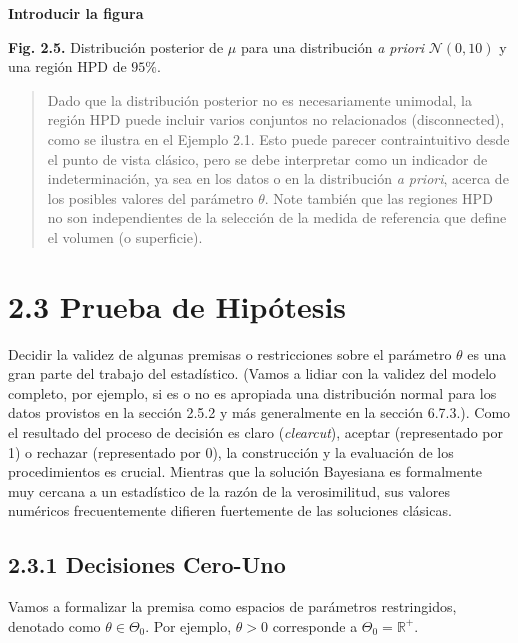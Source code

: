 \documentclass[12pt,]{article}
\begin{document}
\textbf{Introducir la figura}

\textbf{Fig. 2.5.} Distribución posterior de \(\mu\) para una
distribución \emph{a priori} \(\mathcal{N}(0,10)\) y una región HPD de
\(95\%\).

\begin{quote}
Dado que la distribución posterior no es necesariamente unimodal, la
región HPD puede incluir varios conjuntos no relacionados
(disconnected), como se ilustra en el Ejemplo 2.1. Esto puede parecer
contraintuitivo desde el punto de vista clásico, pero se debe
interpretar como un indicador de indeterminación, ya sea en los datos o
en la distribución \emph{a priori}, acerca de los posibles valores del
parámetro \(\theta\). Note también que las regiones HPD no son
independientes de la selección de la medida de referencia que define el
volumen (o superficie).
\end{quote}

\section{2.3 Prueba de Hipótesis}\label{prueba-de-hipotesis}

Decidir la validez de algunas premisas o restricciones sobre el
parámetro \(\theta\) es una gran parte del trabajo del estadístico.
(Vamos a lidiar con la validez del modelo completo, por ejemplo, si es o
no es apropiada una distribución normal para los datos provistos en la
sección 2.5.2 y más generalmente en la sección 6.7.3.). Como el
resultado del proceso de decisión es claro (\emph{clearcut}), aceptar
(representado por 1) o rechazar (representado por 0), la construcción y
la evaluación de los procedimientos es crucial. Mientras que la solución
Bayesiana es formalmente muy cercana a un estadístico de la razón de la
verosimilitud, sus valores numéricos frecuentemente difieren fuertemente
de las soluciones clásicas.

\subsection{2.3.1 Decisiones Cero-Uno}\label{decisiones-cero-uno}

Vamos a formalizar la premisa como espacios de parámetros restringidos,
denotado como \(\theta\in\Theta_0\). Por ejemplo, \(\theta>0\)
corresponde a \(\Theta_0=\mathbb{R}^+\).
\end{document}
